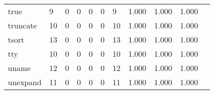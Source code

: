 \begin{longtable}{lp{1.2cm}p{1.2cm}p{1.2cm}p{1.2cm}p{1.2cm}p{1.2cm}p{1.2cm}p{1.2cm}p{1.2cm}p{1.2cm}}
true      &                                     9 &                                                  0 &                                                  0 &                                                  0 &                                                  0 &                                                  9 &                                         1.000 &                                              1.000 &                                              1.000 \\
truncate  &                                    10 &                                                  0 &                                                  0 &                                                  0 &                                                  0 &                                                 10 &                                         1.000 &                                              1.000 &                                              1.000 \\
tsort     &                                    13 &                                                  0 &                                                  0 &                                                  0 &                                                  0 &                                                 13 &                                         1.000 &                                              1.000 &                                              1.000 \\
tty       &                                    10 &                                                  0 &                                                  0 &                                                  0 &                                                  0 &                                                 10 &                                         1.000 &                                              1.000 &                                              1.000 \\
uname     &                                    12 &                                                  0 &                                                  0 &                                                  0 &                                                  0 &                                                 12 &                                         1.000 &                                              1.000 &                                              1.000 \\
unexpand  &                                    11 &                                                  0 &                                                  0 &                                                  0 &                                                  0 &                                                 11 &                                         1.000 &                                              1.000 &                                              1.000 \\

\end{longtable}
